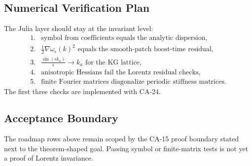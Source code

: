 \subsection{Numerical Verification Plan}

The Julia layer should stay at the invariant level:
\[
\begin{array}{ll}
1.&\text{symbol from coefficients equals the analytic dispersion},\\
2.&\frac12\nabla\omega_\epsilon(k)^2\text{ equals the smooth-patch boost-time residual},\\
3.&\frac{\sin(\epsilon k_a)}{\epsilon}\to k_a\text{ for the KG lattice},\\
4.&\text{anisotropic Hessians fail the Lorentz residual checks},\\
5.&\text{finite Fourier matrices diagonalize periodic stiffness matrices}.
\end{array}
\]
The first three checks are implemented with CA-24.

\subsection{Acceptance Boundary}

The roadmap rows above remain scoped by the CA-15 proof boundary stated next to
the theorem-shaped goal.  Passing symbol or finite-matrix tests is not yet a
proof of Lorentz invariance.
